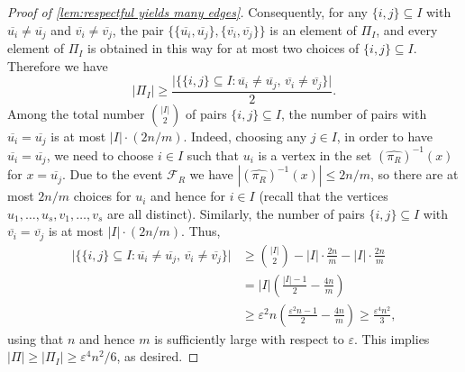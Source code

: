 \documentclass[10pt,a4paper]{amsart}
\newcommand{\eps}{\varepsilon}
\newcommand\ol[1]{\overline{#1}}
\newcommand{\su}{\subseteq}
\newcommand\wh[1]{\widehat{#1}}
\begin{document}
\begin{proof}[Proof of \cref{lem:respectful yields many edges}]
Consequently, for any $\{i,j\}\su I$ with
$\ol{u_i}\ne\ol{u_j}$ and $\ol{v_i}\ne\ol{v_j}$, the pair
$\{\{\ol{u_i},\ol{u_j}\}, \{\ol{v_i},\ol{v_j}\}\}$
is an element of $\Pi_I$, and every element of $\Pi_I$ is obtained in this
way for at most two choices of $\{i,j\}\su I$.
Therefore we have
\[
|\Pi_I| \geq \frac{ \big| \big\{\{i,j\}\su I : \ol{u_i}\ne\ol{u_j},\, \ol{v_i}\ne\ol{v_j} \big\} \big|
}{2}.
\]
Among the total number $\binom{|I|}{2}$ of pairs $\{i,j\}\su I$,
the number of pairs with $\ol{u_i}=\ol{u_j}$ is at most
$|I|\cdot (2n/m)$.
Indeed, choosing any $j\in I$, in order to have $\ol{u_i}=\ol{u_j}$,
we need to choose $i\in I$ such that $u_i$ is a vertex in the set
$(\wh{\pi_R})^{-1}(x)$ for $x=\ol{u_j}$.
Due to the event $\mathcal F_R$ we have
$|(\wh{\pi_R})^{-1}(x)|\leq 2n/m$, so there are at most $2n/m$ choices for $u_i$
and hence for $i\in I$
(recall that the vertices $u_1,\dots,u_s,v_1,\dots,v_s$ are all distinct).
Similarly, the number of pairs $\{i,j\}\su I$ with
$\ol{v_i}=\ol{v_j}$ is at most $|I|\cdot (2n/m)$.
Thus,
\begin{align*}
\big|
\big\{\{i,j\}\su I :
\ol{u_i}\ne\ol{u_j},\,
\ol{v_i}\ne\ol{v_j}
\big\}
\big|
&\geq
\binom{|I|}{2}
- |I|\cdot \frac{2n}{m}
- |I|\cdot \frac{2n}{m} \\
&=
|I|\left(\frac{|I|-1}{2}-\frac{4n}{m}\right) \\
&\geq
\eps^2 n
\left(\frac{\eps^2 n-1}{2}-\frac{4n}{m}\right)
\geq
\frac{\eps^4 n^2}{3},
\end{align*}
using that $n$ and hence $m$ is sufficiently large with respect to $\eps$.
This implies
$|\Pi|\geq |\Pi_I|\geq \eps^4 n^2/6$, as desired.
\end{proof}
\end{document}
